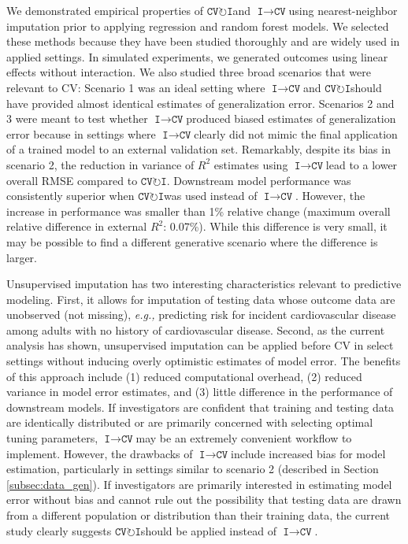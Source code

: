 \documentclass[AMA,STIX1COL,doublespace]{WileyNJD-v2}
\begin{document}
We demonstrated empirical properties of
$\texttt{CV}\!\circlearrowright\!\texttt{I}$\space and
$\texttt{I}\!\!\rightarrow\!\texttt{CV}$\space using nearest-neighbor
imputation prior to applying regression and random forest models. We
selected these methods because they have been studied thoroughly and are
widely used in applied settings. In simulated experiments, we generated
outcomes using linear effects without interaction. We also studied three
broad scenarios that were relevant to CV: Scenario 1 was an ideal
setting where $\texttt{I}\!\!\rightarrow\!\texttt{CV}$\space and
$\texttt{CV}\!\circlearrowright\!\texttt{I}$\space should have provided
almost identical estimates of generalization error. Scenarios 2 and 3
were meant to test whether
$\texttt{I}\!\!\rightarrow\!\texttt{CV}$\space produced biased estimates
of generalization error because in settings where
$\texttt{I}\!\!\rightarrow\!\texttt{CV}$\space clearly did not mimic the
final application of a trained model to an external validation set.
Remarkably, despite its bias in scenario 2, the reduction in variance of
\(R^2\) estimates using
$\texttt{I}\!\!\rightarrow\!\texttt{CV}$\space lead to a lower overall
RMSE compared to $\texttt{CV}\!\circlearrowright\!\texttt{I}$.
Downstream model performance was consistently superior when
$\texttt{CV}\!\circlearrowright\!\texttt{I}$\space was used instead of
$\texttt{I}\!\!\rightarrow\!\texttt{CV}$. However, the increase in
performance was smaller than 1\% relative change (maximum overall
relative difference in external \(R^2\): 0.07\%). While this difference
is very small, it may be possible to find a different generative
scenario where the difference is larger.

Unsupervised imputation has two interesting characteristics relevant to
predictive modeling. First, it allows for imputation of testing data
whose outcome data are unobserved (not missing),
\textit{e.g., }predicting risk for incident cardiovascular disease among
adults with no history of cardiovascular disease. Second, as the current
analysis has shown, unsupervised imputation can be applied before CV in
select settings without inducing overly optimistic estimates of model
error. The benefits of this approach include (1) reduced computational
overhead, (2) reduced variance in model error estimates, and (3) little
difference in the performance of downstream models. If investigators are
confident that training and testing data are identically distributed or
are primarily concerned with selecting optimal tuning parameters,
$\texttt{I}\!\!\rightarrow\!\texttt{CV}$\space may be an extremely
convenient workflow to implement. However, the drawbacks of
$\texttt{I}\!\!\rightarrow\!\texttt{CV}$\space include increased bias
for model estimation, particularly in settings similar to scenario 2
(described in Section \ref{subsec:data_gen}). If investigators are
primarily interested in estimating model error without bias and cannot
rule out the possibility that testing data are drawn from a different
population or distribution than their training data, the current study
clearly suggests
$\texttt{CV}\!\circlearrowright\!\texttt{I}$\space should be applied
instead of $\texttt{I}\!\!\rightarrow\!\texttt{CV}$.
\end{document}

